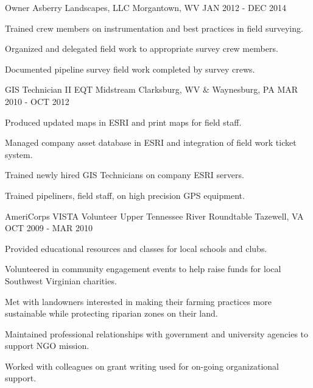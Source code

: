 \begin{cventries}

\cventry
{Owner} %
{Asberry Landscapes, LLC} %
{Morgantown, WV} %
{JAN 2012 - DEC 2014} %
{ %
\begin{cvitems}
\item {Trained crew members on instrumentation and best practices in field surveying.}
\item {Organized and delegated field work to appropriate survey crew members.}
\item {Documented pipeline survey field work completed by survey crews.}
\end{cvitems} 
}


\cventry
{GIS Technician II} %
{EQT Midstream} %
{Clarksburg, WV \& Waynesburg, PA} %
{MAR 2010 - OCT 2012} %
{ %
\begin{cvitems}
\item {Produced updated maps in ESRI and print maps for field staff.}
\item {Managed company asset database in ESRI and integration of field work ticket system.}
\item {Trained newly hired GIS Technicians on company ESRI servers.}
\item {Trained pipeliners, field staff, on high precision GPS equipment.}
\end{cvitems}
}


\cventry
{AmeriCorps VISTA Volunteer} %
{Upper Tennessee River Roundtable} %
{Tazewell, VA} %
{OCT 2009 - MAR 2010} %
{ %
\begin{cvitems}
\item {Provided educational resources and classes for local schools and clubs.}
\item {Volunteered in community engagement events to help raise funds for local Southwest Virginian charities.}
\item {Met with landowners interested in making their farming practices more sustainable while protecting riparian zones on their land.}
\item {Maintained professional relationships with government and university agencies to support NGO mission.}
\item {Worked with colleagues on grant writing used for on-going organizational support.}
\end{cvitems}
}


\end{cventries}
